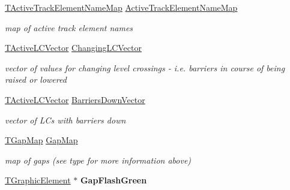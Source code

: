 \begin{DoxyCompactItemize}
\mbox{\label{class_t_track_a5b5b9e68cd57f74466f25f989326d316}} 
\mbox{\hyperlink{class_t_track_af78e1d88c49cebd05b35fc408a5d9d2e}{T\+Active\+Track\+Element\+Name\+Map}} \mbox{\hyperlink{class_t_track_a5b5b9e68cd57f74466f25f989326d316}{Active\+Track\+Element\+Name\+Map}}
\begin{DoxyCompactList}\small\item\em map of active track element names \end{DoxyCompactList}\item 
\mbox{\label{class_t_track_af81ededf353294c66fbdcc4c20ba545f}} 
\mbox{\hyperlink{class_t_track_af124e944cfb44075f390cf5eceaf3e66}{T\+Active\+L\+C\+Vector}} \mbox{\hyperlink{class_t_track_af81ededf353294c66fbdcc4c20ba545f}{Changing\+L\+C\+Vector}}
\begin{DoxyCompactList}\small\item\em vector of values for changing level crossings -\/ i.\+e. barriers in course of being raised or lowered \end{DoxyCompactList}\item 
\mbox{\label{class_t_track_a125f335f138343a30260abc12fa6efd3}} 
\mbox{\hyperlink{class_t_track_af124e944cfb44075f390cf5eceaf3e66}{T\+Active\+L\+C\+Vector}} \mbox{\hyperlink{class_t_track_a125f335f138343a30260abc12fa6efd3}{Barriers\+Down\+Vector}}
\begin{DoxyCompactList}\small\item\em vector of L\+Cs with barriers down \end{DoxyCompactList}\item 
\mbox{\label{class_t_track_a856fcf6873049774bf2b8b3e28a0c17c}} 
\mbox{\hyperlink{class_t_track_a57d1f751f59c96c16918a044b3d271f7}{T\+Gap\+Map}} \mbox{\hyperlink{class_t_track_a856fcf6873049774bf2b8b3e28a0c17c}{Gap\+Map}}
\begin{DoxyCompactList}\small\item\em map of gaps (see type for more information above) \end{DoxyCompactList}\item 
\mbox{\label{class_t_track_a77f6e7d47a768e0867d0975418364959}} 
\mbox{\hyperlink{class_t_graphic_element}{T\+Graphic\+Element}} $\ast$ {\bfseries Gap\+Flash\+Green}
\item 

\end{DoxyCompactItemize}
